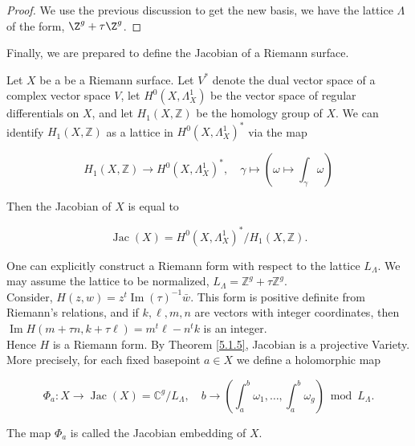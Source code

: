 \begin{proof}
    We use the previous discussion to get the new basis, we have the lattice $\Lambda$ of the form, $\Z^g+\tau\Z^g$.   
    \end{proof}
Finally, we are prepared to define the Jacobian of a Riemann surface. 

\begin{definition}
   Let $X$ be a be a Riemann surface. Let $V^{*}$ denote the dual vector space of a complex vector space $V$, let $H^{0}\left(X, \Lambda_{X}^{1}\right)$ be the vector space of regular differentials on $X$, and let $H_{1}(X, \mathbb{Z})$ be the homology group of $X$. We can identify $H_{1}(X, \mathbb{Z})$ as a lattice in $H^{0}\left(X, \Lambda_{X}^{1}\right)^{*}$ via the map

$$
H_{1}(X, \mathbb{Z}) \longrightarrow H^{0}\left(X, \Lambda_{X}^{1}\right)^{*}, \quad \gamma \longmapsto\left(\omega \mapsto \int_{\gamma} \omega\right)
$$

Then the Jacobian of $X$ is equal to

$$
\operatorname{Jac}(X)=H^{0}\left(X, \Lambda_{X}^{1}\right)^{*} / H_{1}(X, \mathbb{Z}) .
$$

\end{definition}

\begin{remark}
   One can explicitly construct a Riemann form with respect to the lattice $L_{\Lambda}$. We may assume the lattice to be normalized, $L_{\Lambda}=\mathbb{Z}^{g}+\tau \mathbb{Z}^{g}$.\\
   Consider, $H(z, w)= z^{t} \operatorname{Im}(\tau)^{-1} \bar{w}$. This form is positive definite from Riemann's relations, and if $k, \ell, m, n$ are vectors with integer coordinates, then $\operatorname{Im} H(m+\tau n, k+\tau \ell)= m^{t} \ell-n^{t}k$ is an integer. \\
   Hence $H$ is a Riemann form. By Theorem \ref{5.1.5}, Jacobian is a projective Variety. \\
   More precisely, for each fixed basepoint $a \in X$ we define a holomorphic map

$$
\Phi_{a}: X \longrightarrow \operatorname{Jac}(X)=\mathbb{C}^{g} / L_{\Lambda}, \quad b \longrightarrow\left(\int_{a}^{b} \omega_{1}, \ldots, \int_{a}^{b} \omega_{g}\right) \bmod L_{\Lambda} .
$$

\end{remark}

\begin{definition}
    
The map $\Phi_{a}$ is called the Jacobian embedding of $X$. \\
\end{definition}

